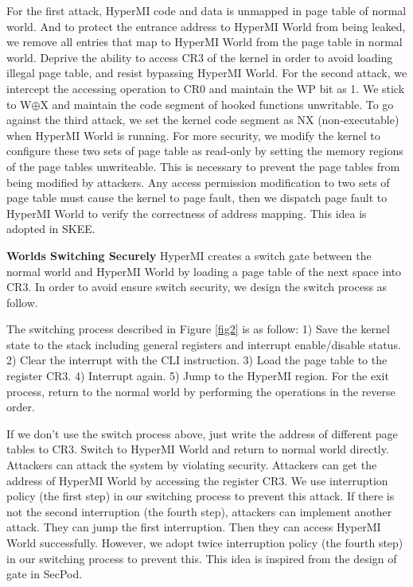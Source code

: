 \documentclass[conference]{IEEEtran}
\begin{document}
For the first attack, HyperMI code and data is unmapped in page table of normal world. And to protect the entrance address to HyperMI World from being leaked,
we remove all entries that map to HyperMI World from the page table in normal world. Deprive the ability to access CR3 of the kernel in order to avoid loading illegal page table, and resist bypassing HyperMI World.
For the second attack, we intercept the accessing operation to CR0 and maintain the WP bit as 1. We stick to W$\oplus${X} and maintain the code segment of hooked functions unwritable.
To go against the third attack, we set the kernel code segment as NX (non-executable) when HyperMI World is running. For more security, we modify the kernel to configure these two sets of page table as read-only by setting the memory regions of the page tables unwriteable. This is necessary to prevent the page tables from being modified by attackers. Any access permission modification to two sets of page table must cause the kernel to page fault, then we dispatch page fault to HyperMI World to verify the correctness of address mapping. 
This idea is adopted in SKEE\cite{Azab2016SKEE}.


\textbf{Worlds Switching Securely}
HyperMI creates a switch gate between the normal world and HyperMI World by loading a page table of the next space into CR3.
In order to avoid ensure switch security, we design the switch process as follow.

The switching process described in Figure \ref{fig2} is as follow: 1) Save the kernel state to the stack including general registers and interrupt enable/disable status. 2) Clear the interrupt with the CLI instruction. 3) Load the page table to the register CR3. 4) Interrupt again. 5) Jump to the HyperMI region. For the exit process, return to the normal world by performing the operations in the reverse order.

\iffalse
If we don't use the switch process above, just write the address of different page tables to CR3. Switch to HyperMI World and return to normal world directly. Attackers can attack the system by violating security. Attackers can get the address of HyperMI World by accessing the register CR3. We use interruption policy (the first step) in our switching process to prevent this attack. 
If there is not the second interruption (the fourth step), attackers can implement another attack. They can jump the first interruption.
Then they can access HyperMI World successfully. 
However, we adopt twice interruption policy (the fourth step) in our switching process to prevent this. 
This idea is inspired from the design of gate in SecPod\cite{Wang2015SecPod}.
\end{document}
